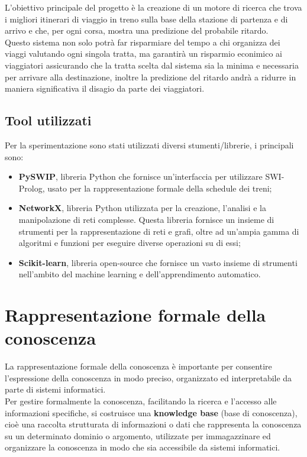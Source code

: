 \documentclass[italian,12pt,a4paper]{article}
\begin{document}
		L'obiettivo principale del progetto è la creazione di un motore di ricerca che trova i migliori itinerari di viaggio in treno sulla base della stazione di partenza e di arrivo e che, per ogni corsa, mostra una predizione del probabile ritardo.\\
		Questo sistema non solo potrà far risparmiare del tempo a chi organizza dei viaggi valutando ogni singola tratta, ma garantirà un risparmio econimico ai viaggiatori assicurando che la tratta scelta dal sistema sia la minima e necessaria per arrivare alla destinazione, inoltre la predizione del ritardo andrà a ridurre in maniera significativa il disagio da parte dei viaggiatori. 
		
	
		\subsection{Tool utilizzati}
		Per la sperimentazione sono stati utilizzati diversi stumenti/librerie, i principali sono:
		
			\begin{itemize}
				\item \textbf{PySWIP}, libreria Python che fornisce un'interfaccia per utilizzare SWI-Prolog, usato per la rappresentazione formale della schedule dei treni;
				\item \textbf{NetworkX}, libreria Python utilizzata per la creazione, l'analisi e la manipolazione di reti complesse. Questa libreria fornisce un insieme di strumenti per la rappresentazione di reti e grafi, oltre ad un'ampia gamma di algoritmi e funzioni per eseguire diverse operazioni su di essi;
				\item \textbf{Scikit-learn}, libreria open-source che fornisce un vasto insieme di strumenti nell'ambito del machine learning e dell'apprendimento automatico.
			\end{itemize}

	\section{Rappresentazione formale della conoscenza}
	
		La rappresentazione formale della conoscenza è importante per consentire l'espressione della conoscenza in modo preciso, organizzato ed interpretabile da parte di sistemi informatici.\\
		Per gestire formalmente la conoscenza, facilitando la ricerca e l'accesso alle informazioni specifiche, si costruisce una \textbf{knowledge base} (base di conoscenza), cioè una raccolta strutturata di informazioni o dati che rappresenta la conoscenza su un determinato dominio o argomento, utilizzate per immagazzinare ed organizzare la conoscenza in modo che sia accessibile da sistemi informatici.
		
\end{document}
